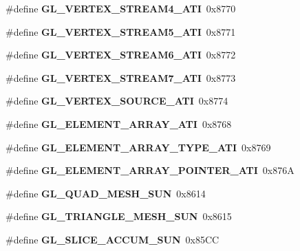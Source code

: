\begin{DoxyCompactItemize}
\item 
\#define {\bfseries G\+L\+\_\+\+V\+E\+R\+T\+E\+X\+\_\+\+S\+T\+R\+E\+A\+M4\+\_\+\+A\+T\+I}~0x8770\label{_s_d_l__opengl_8h_ac3d92c3f367647e3b9ff44edb9ecaed3}

\item 
\#define {\bfseries G\+L\+\_\+\+V\+E\+R\+T\+E\+X\+\_\+\+S\+T\+R\+E\+A\+M5\+\_\+\+A\+T\+I}~0x8771\label{_s_d_l__opengl_8h_aa72b951b6903523d1f5eec3b3e7ff13b}

\item 
\#define {\bfseries G\+L\+\_\+\+V\+E\+R\+T\+E\+X\+\_\+\+S\+T\+R\+E\+A\+M6\+\_\+\+A\+T\+I}~0x8772\label{_s_d_l__opengl_8h_a694f243a7db59c6e071bcdc81c6b5c6a}

\item 
\#define {\bfseries G\+L\+\_\+\+V\+E\+R\+T\+E\+X\+\_\+\+S\+T\+R\+E\+A\+M7\+\_\+\+A\+T\+I}~0x8773\label{_s_d_l__opengl_8h_ac33884bef584579e14e9f7ce96ecf8b0}

\item 
\#define {\bfseries G\+L\+\_\+\+V\+E\+R\+T\+E\+X\+\_\+\+S\+O\+U\+R\+C\+E\+\_\+\+A\+T\+I}~0x8774\label{_s_d_l__opengl_8h_ab863e45e7c4cd0bdd24640a6a97ed024}

\item 
\#define {\bfseries G\+L\+\_\+\+E\+L\+E\+M\+E\+N\+T\+\_\+\+A\+R\+R\+A\+Y\+\_\+\+A\+T\+I}~0x8768\label{_s_d_l__opengl_8h_ac0d748284df954ba94d03ebf1a13252b}

\item 
\#define {\bfseries G\+L\+\_\+\+E\+L\+E\+M\+E\+N\+T\+\_\+\+A\+R\+R\+A\+Y\+\_\+\+T\+Y\+P\+E\+\_\+\+A\+T\+I}~0x8769\label{_s_d_l__opengl_8h_a9fd31f453c418ff8270fff081271a2b5}

\item 
\#define {\bfseries G\+L\+\_\+\+E\+L\+E\+M\+E\+N\+T\+\_\+\+A\+R\+R\+A\+Y\+\_\+\+P\+O\+I\+N\+T\+E\+R\+\_\+\+A\+T\+I}~0x876\+A\label{_s_d_l__opengl_8h_a1267937bb0aa30bfb3f500f6fc1974cb}

\item 
\#define {\bfseries G\+L\+\_\+\+Q\+U\+A\+D\+\_\+\+M\+E\+S\+H\+\_\+\+S\+U\+N}~0x8614\label{_s_d_l__opengl_8h_a2ab60eca80b88f476fde0b9c4c3d59f3}

\item 
\#define {\bfseries G\+L\+\_\+\+T\+R\+I\+A\+N\+G\+L\+E\+\_\+\+M\+E\+S\+H\+\_\+\+S\+U\+N}~0x8615\label{_s_d_l__opengl_8h_a57c713fb8af322ed512c0f78fd36da6d}

\item 
\#define {\bfseries G\+L\+\_\+\+S\+L\+I\+C\+E\+\_\+\+A\+C\+C\+U\+M\+\_\+\+S\+U\+N}~0x85\+C\+C\label{_s_d_l__opengl_8h_a7c248f34ba5e8cc18f97b920d445ac6f}


\end{DoxyCompactItemize}
